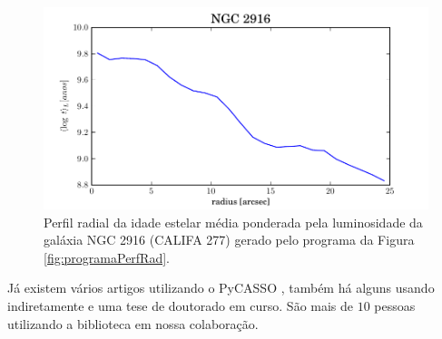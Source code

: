 \begin{figure}
	\includegraphics{figuras/at_flux_radprof.pdf}
	\caption[Perfil radial da idade estelar média da galáxia NGC 2916]
	{Perfil radial da idade estelar média ponderada pela luminosidade da galáxia
	NGC 2916 (CALIFA 277) gerado pelo programa da Figura \ref{fig:programaPerfRad}.}
	\label{fig:perfRad}
\end{figure}

Já existem vários artigos utilizando o PyCASSO \citep{CidFernandes2013,
CidFernandes2014, Perez2013, GonzalezDelgado2013}, também há alguns usando
indiretamente \citep{Husemann2013, IglesiasParamo2013} e uma tese de doutorado
em curso. São mais de $10$ pessoas utilizando a biblioteca em nossa colaboração.


